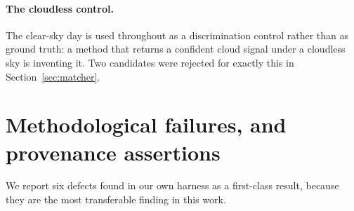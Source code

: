 \documentclass[11pt,a4paper]{article}
\begin{document}
\paragraph{The cloudless control.} The clear-sky day is used throughout as a discrimination
control rather than as ground truth: a method that returns a confident cloud signal under a
cloudless sky is inventing it. Two candidates were rejected for exactly this in
Section~\ref{sec:matcher}.

\section{Methodological failures, and provenance assertions}
\label{sec:provenance}

We report six defects found in our own harness as a first-class result, because they are the
most transferable finding in this work.
\end{document}
